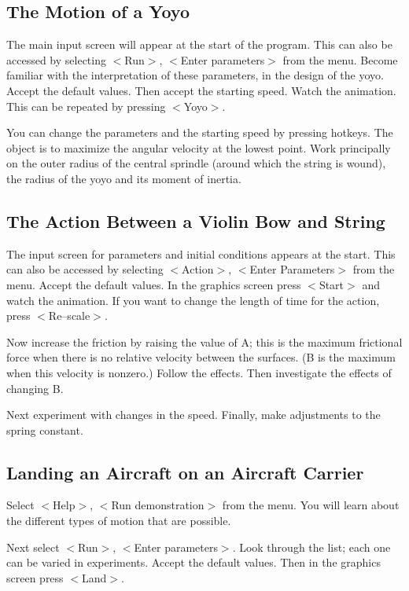 \subsection{The Motion of a Yoyo}

   The main input screen will appear at the start of the program.
This can also be accessed by selecting $<$Run$>$, $<$Enter parameters$>$
from the menu. Become familiar with the interpretation of these
parameters, in the design of the yoyo. Accept the default values.
Then accept the starting speed. Watch the animation. This can be
repeated by pressing $<$Yoyo$>$.

   You can change the parameters and the starting speed by pressing
hotkeys. The object is to maximize the angular velocity at the
lowest point. Work principally on the outer radius of the central
sprindle (around which the string is wound), the radius of the yoyo
and its moment of inertia.



\subsection{The Action Between a Violin Bow and String}

   The input screen for parameters and initial conditions appears at
the start. This can also be accessed by selecting $<$Action$>$, $<$Enter
Parameters$>$ from the menu. Accept the default values. In the graphics
screen press $<$Start$>$ and watch the animation. If you want to change
the length of time for the action, press $<$Re--scale$>$.

   Now increase the friction by raising the value of A; this is the
maximum frictional force when there is no relative velocity between
the surfaces. (B is the maximum when this velocity is nonzero.) Follow
the effects. Then investigate the effects of changing B.

   Next experiment with changes in the speed. Finally, make adjustments
to the spring constant.



\subsection{Landing an Aircraft on an Aircraft Carrier}

   Select $<$Help$>$, $<$Run demonstration$>$ from the menu. You will learn
about the different types of motion that are possible.

   Next select $<$Run$>$, $<$Enter parameters$>$. Look through the list; each
one can be varied in experiments. Accept the default values. Then
in the graphics screen press $<$Land$>$.

